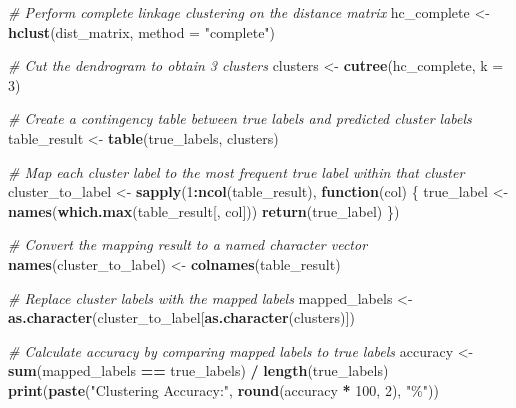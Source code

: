\documentclass[
]{article}
\newenvironment{Shaded}{\begin{snugshade}}{\end{snugshade}}
\newcommand{\AttributeTok}[1]{\textcolor[rgb]{0.13,0.29,0.53}{#1}}
\newcommand{\CommentTok}[1]{\textcolor[rgb]{0.56,0.35,0.01}{\textit{#1}}}
\newcommand{\ControlFlowTok}[1]{\textcolor[rgb]{0.13,0.29,0.53}{\textbf{#1}}}
\newcommand{\DecValTok}[1]{\textcolor[rgb]{0.00,0.00,0.81}{#1}}
\newcommand{\FunctionTok}[1]{\textcolor[rgb]{0.13,0.29,0.53}{\textbf{#1}}}
\newcommand{\NormalTok}[1]{#1}
\newcommand{\OtherTok}[1]{\textcolor[rgb]{0.56,0.35,0.01}{#1}}
\newcommand{\SpecialCharTok}[1]{\textcolor[rgb]{0.81,0.36,0.00}{\textbf{#1}}}
\newcommand{\StringTok}[1]{\textcolor[rgb]{0.31,0.60,0.02}{#1}}
\begin{document}
\begin{Shaded}
\begin{Highlighting}[]
\CommentTok{\# Perform complete linkage clustering on the distance matrix}
\NormalTok{hc\_complete }\OtherTok{\textless{}{-}} \FunctionTok{hclust}\NormalTok{(dist\_matrix, }\AttributeTok{method =} \StringTok{"complete"}\NormalTok{)}

\CommentTok{\# Cut the dendrogram to obtain 3 clusters}
\NormalTok{clusters }\OtherTok{\textless{}{-}} \FunctionTok{cutree}\NormalTok{(hc\_complete, }\AttributeTok{k =} \DecValTok{3}\NormalTok{)}

\CommentTok{\# Create a contingency table between true labels and predicted cluster labels}
\NormalTok{table\_result }\OtherTok{\textless{}{-}} \FunctionTok{table}\NormalTok{(true\_labels, clusters)}

\CommentTok{\# Map each cluster label to the most frequent true label within that cluster}
\NormalTok{cluster\_to\_label }\OtherTok{\textless{}{-}} \FunctionTok{sapply}\NormalTok{(}\DecValTok{1}\SpecialCharTok{:}\FunctionTok{ncol}\NormalTok{(table\_result), }\ControlFlowTok{function}\NormalTok{(col) \{}
\NormalTok{  true\_label }\OtherTok{\textless{}{-}} \FunctionTok{names}\NormalTok{(}\FunctionTok{which.max}\NormalTok{(table\_result[, col]))}
  \FunctionTok{return}\NormalTok{(true\_label)}
\NormalTok{\})}

\CommentTok{\# Convert the mapping result to a named character vector}
\FunctionTok{names}\NormalTok{(cluster\_to\_label) }\OtherTok{\textless{}{-}} \FunctionTok{colnames}\NormalTok{(table\_result)}

\CommentTok{\# Replace cluster labels with the mapped labels}
\NormalTok{mapped\_labels }\OtherTok{\textless{}{-}} \FunctionTok{as.character}\NormalTok{(cluster\_to\_label[}\FunctionTok{as.character}\NormalTok{(clusters)])}

\CommentTok{\# Calculate accuracy by comparing mapped labels to true labels}
\NormalTok{accuracy }\OtherTok{\textless{}{-}} \FunctionTok{sum}\NormalTok{(mapped\_labels }\SpecialCharTok{==}\NormalTok{ true\_labels) }\SpecialCharTok{/} \FunctionTok{length}\NormalTok{(true\_labels)}
\FunctionTok{print}\NormalTok{(}\FunctionTok{paste}\NormalTok{(}\StringTok{"Clustering Accuracy:"}\NormalTok{, }\FunctionTok{round}\NormalTok{(accuracy }\SpecialCharTok{*} \DecValTok{100}\NormalTok{, }\DecValTok{2}\NormalTok{), }\StringTok{"\%"}\NormalTok{))}
\end{Highlighting}
\end{Shaded}
\end{document}
